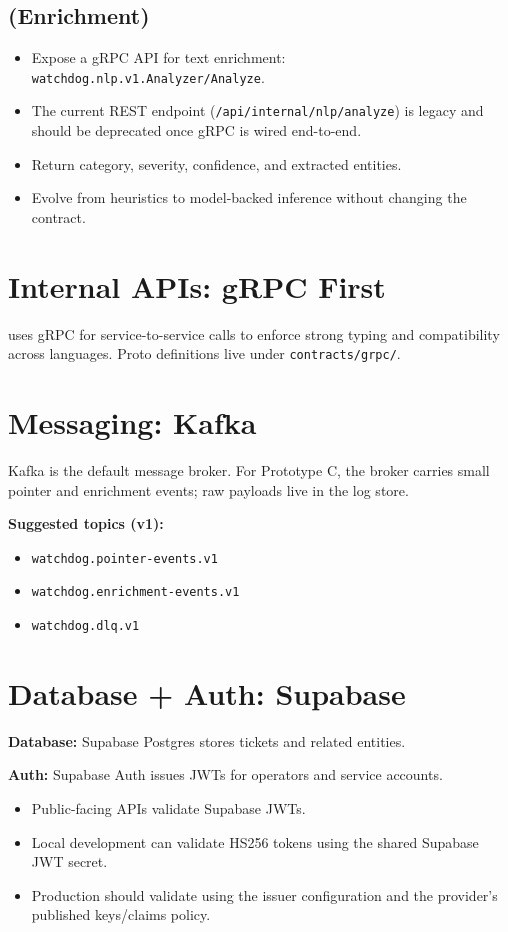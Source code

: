 \documentclass[11pt]{article}
\begin{document}
\subsection{ (Enrichment)}
\begin{itemize}
  \item Expose a gRPC API for text enrichment: \texttt{watchdog.nlp.v1.Analyzer/Analyze}.
  \item The current REST endpoint (\texttt{/api/internal/nlp/analyze}) is legacy and should be deprecated once gRPC is wired end-to-end.
  \item Return category, severity, confidence, and extracted entities.
  \item Evolve from heuristics to model-backed inference without changing the contract.
\end{itemize}

\section{Internal APIs: gRPC First}
\watchdog{} uses gRPC for service-to-service calls to enforce strong typing and compatibility across languages.
Proto definitions live under \texttt{contracts/grpc/}.

\section{Messaging: Kafka}
Kafka is the default message broker.
For Prototype C, the broker carries small pointer and enrichment events; raw payloads live in the log store.

\textbf{Suggested topics (v1):}
\begin{itemize}
  \item \texttt{watchdog.pointer-events.v1}
  \item \texttt{watchdog.enrichment-events.v1}
  \item \texttt{watchdog.dlq.v1}
\end{itemize}

\section{Database + Auth: Supabase}
\textbf{Database:} Supabase Postgres stores tickets and related entities.

\textbf{Auth:} Supabase Auth issues JWTs for operators and service accounts.
\begin{itemize}
  \item Public-facing APIs validate Supabase JWTs.
  \item Local development can validate HS256 tokens using the shared Supabase JWT secret.
  \item Production should validate using the issuer configuration and the provider's published keys/claims policy.
\end{itemize}
\end{document}
